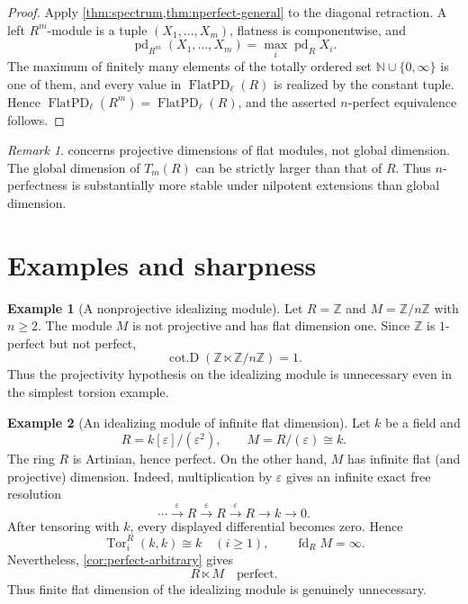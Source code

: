 \documentclass[11pt,reqno]{amsart}
\newcommand{\pd}{\operatorname{pd}}
\newcommand{\fd}{\operatorname{fd}}
\newcommand{\cotD}{\operatorname{cot.D}}
\newcommand{\Tor}{\operatorname{Tor}}
\newcommand{\FlatPD}{\operatorname{FlatPD}}
\theoremstyle{plain}
\theoremstyle{definition}
\newtheorem{example}[example]{Example}
\theoremstyle{remark}
\newtheorem{remark}[remark]{Remark}
\begin{document}
\begin{proof}
Apply \cref{thm:spectrum,thm:nperfect-general} to the diagonal retraction.  A left $R^m$-module is a tuple $(X_1,\dots,X_m)$, flatness is componentwise, and
\[
 \pd_{R^m}(X_1,\dots,X_m)=\max_i\pd_R X_i.
\]
The maximum of finitely many elements of the totally ordered set $\mathbb N\cup\{0,\infty\}$ is one of them, and every value in $\FlatPD_\ell(R)$ is realized by the constant tuple.  Hence $\FlatPD_\ell(R^m)=\FlatPD_\ell(R)$, and the asserted $n$-perfect equivalence follows.
\end{proof}

\begin{remark}\label{rem:gldim}
 concerns projective dimensions of flat modules, not global
dimension.  The global dimension of $T_m(R)$ can be strictly larger than that of
$R$.  Thus $n$-perfectness is substantially more stable under nilpotent extensions
than global dimension.
\end{remark}

\section{Examples and sharpness}

\begin{example}[A nonprojective idealizing module]\label{ex:zn}
Let $R=\mathbb Z$ and $M=\mathbb Z/n\mathbb Z$ with $n\ge2$.  The module $M$ is
not projective and has flat dimension one.  Since $\mathbb Z$ is $1$-perfect but
not perfect,
\[
  \cotD(\mathbb Z\ltimes\mathbb Z/n\mathbb Z)=1.
\]
Thus the projectivity hypothesis on the idealizing module is unnecessary even in
the simplest torsion example.
\end{example}

\begin{example}[An idealizing module of infinite flat dimension]\label{ex:arbitraryM}
Let $k$ be a field and
\[
 R=k[\varepsilon]/(\varepsilon^2),
 \qquad M=R/(\varepsilon)\cong k.
\]
The ring $R$ is Artinian, hence perfect.  On the other hand, $M$ has infinite flat
(and projective) dimension.  Indeed, multiplication by $\varepsilon$ gives an
infinite exact free resolution
\[
 \cdots\xrightarrow{\varepsilon}R
 \xrightarrow{\varepsilon}R
 \xrightarrow{\varepsilon}R\longrightarrow k\longrightarrow0.
\]
After tensoring with $k$, every displayed differential becomes zero.  Hence
\[
  \Tor_i^R(k,k)\cong k\quad(i\ge1),
  \qquad \fd_RM=\infty.
\]
Nevertheless, \cref{cor:perfect-arbitrary} gives
\[
 R\ltimes M\quad\text{perfect}.
\]
Thus finite flat dimension of the idealizing module is genuinely unnecessary.
\end{example}
\end{document}
